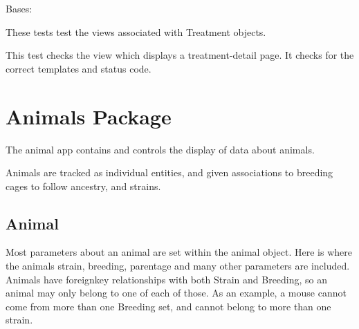 \documentclass[letterpaper,10pt,english]{sphinxmanual}
\begin{document}
\begin{fulllineitems}
\label{api:mousedb.data.tests.TreatmentViewTests}
Bases: 

These tests test the views associated with Treatment objects.


\begin{fulllineitems}
\label{api:mousedb.data.tests.TreatmentViewTests.setUp}
\end{fulllineitems}



\begin{fulllineitems}
\label{api:mousedb.data.tests.TreatmentViewTests.tearDown}
\end{fulllineitems}



\begin{fulllineitems}
\label{api:mousedb.data.tests.TreatmentViewTests.test_treatment_detail}
This test checks the view which displays a treatment-detail page.  It checks for the correct templates and status code.

\end{fulllineitems}


\end{fulllineitems}



\section{Animals Package}
\label{api:animals-package}\label{api:module-mousedb.animal}
The animal app contains and controls the display of data about animals.

Animals are tracked as individual entities, and given associations to breeding cages to follow ancestry, and strains.


\subsection{Animal}
\label{api:animal}
Most parameters about an animal are set within the animal object.  Here is where the animals strain, breeding, parentage and many other parameters are included.  Animals have foreignkey relationships with both Strain and Breeding, so an animal may only belong to one of each of those.  As an example, a mouse cannot come from more than one Breeding set, and cannot belong to more than one strain.
\end{document}
